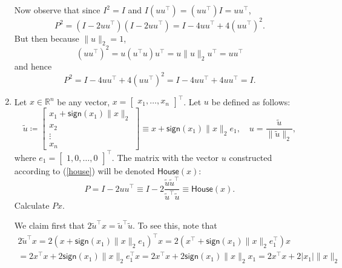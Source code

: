 \documentclass{../../../kin_math}
\begin{document}
\begin{questions}
\begin{enumerate}
\begin{solution}
      Now observe that since $I^2 = I$ and $I(uu^\top) = (uu^\top)I = uu^\top$,
      \begin{equation*}
        P^2 = (I - 2uu^\top)(I - 2uu^\top) = I - 4uu^\top + 4(uu^\top)^2.
      \end{equation*}
      But then because $\lVert u \rVert_2 = 1$,
      \begin{equation*}
        (uu^\top)^2 = u(u^\top u)u^\top = u\lVert u \rVert_2 u^\top = uu^\top
      \end{equation*}
      and hence
      \begin{equation*}
        P^2 = I - 4uu^\top + 4(uu^\top)^2 = I - 4uu^\top + 4uu^\top = I.
      \end{equation*}
    \end{solution}
    \item Let $x \in \mathbb{R}^n$ be any vector, $x = \begin{bmatrix} x_1, \dots, x_n \end{bmatrix}^\top$. Let $u$ be defined as follows:
    \begin{equation} \label{house}
      \tilde{u} \coloneqq \begin{bmatrix} x_1 + \textsf{sign}(x_1) \lVert x \rVert_2 \\ x_2 \\ \vdots \\ x_n \end{bmatrix} \equiv x + \textsf{sign}(x_1) \lVert x \rVert_2 e_1, \quad u = \frac{\tilde{u}}{\lVert \tilde{u} \rVert_2},
    \end{equation}
    where $e_1 = \begin{bmatrix} 1, 0, \dots, 0 \end{bmatrix}^\top$. The matrix with the vector $u$ constructed according to (\ref{house}) will be denoted $\textsf{House}(x)$:
    \begin{equation*}
      P = I - 2uu^\top \equiv I - 2\frac{\tilde{u}\tilde{u}^\top}{\tilde{u}^\top\tilde{u}} \equiv \textsf{House}(x).
    \end{equation*}
    Calculate $Px$.
    \begin{solution}
      We claim first that $2 \tilde{u}^\top x = \tilde{u}^\top \tilde{u}$. To see this, note that
      \begin{multline*}
        2 \tilde{u}^\top x = 2 (x + \textsf{sign}(x_1) \lVert x \rVert_2 e_1)^\top x = 2 (x^\top + \textsf{sign}(x_1) \lVert x \rVert_2 e_1^\top) x \\
        = 2 x^\top x + 2 \textsf{sign}(x_1) \lVert x \rVert_2 e_1^\top x = 2 x^\top x + 2 \textsf{sign}(x_1) \lVert x \rVert_2 x_1 = 2 x^\top x + 2 |x_1| \lVert x \rVert_2

\end{multline*}
\end{solution}
\end{enumerate}
\end{questions}
\end{document}
